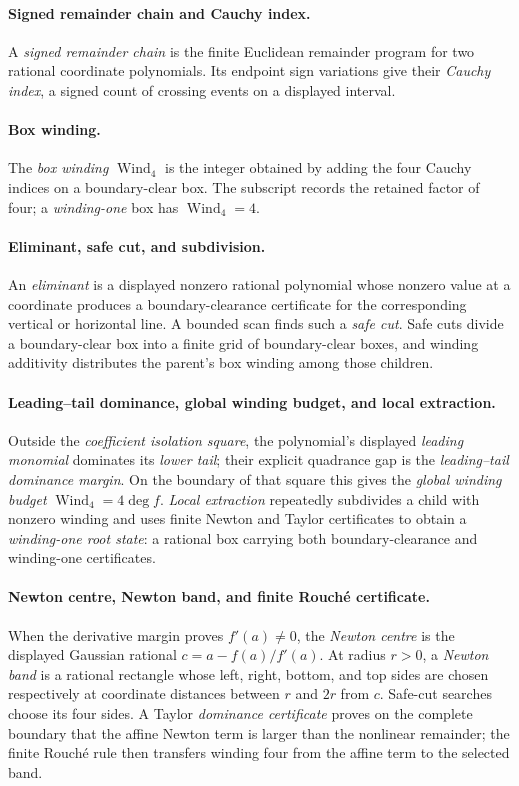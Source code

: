 \documentclass[11pt]{article}
\newcommand{\Wind}{\operatorname{Wind}}
\begin{document}
\paragraph{Signed remainder chain and Cauchy index.}
A \emph{signed remainder chain} is the finite Euclidean remainder program
for two rational coordinate polynomials.  Its endpoint sign variations give
their \emph{Cauchy index}, a signed count of crossing events on a displayed
interval.

\paragraph{Box winding.}
The \emph{box winding} $\Wind_4$ is the integer obtained by adding the four
Cauchy indices on a boundary-clear box.  The subscript records the retained
factor of four; a \emph{winding-one} box has $\Wind_4=4$.

\paragraph{Eliminant, safe cut, and subdivision.}
An \emph{eliminant} is a displayed nonzero rational polynomial whose nonzero
value at a coordinate produces a boundary-clearance certificate for the
corresponding vertical or horizontal line.  A bounded scan finds such a
\emph{safe cut}.  Safe cuts divide a boundary-clear box into a finite grid of
boundary-clear boxes, and winding additivity distributes the parent's box
winding among those children.

\paragraph{Leading--tail dominance, global winding budget, and local
extraction.}
Outside the \emph{coefficient isolation square}, the polynomial's displayed
\emph{leading monomial} dominates its \emph{lower tail}; their explicit
quadrance gap is the \emph{leading--tail dominance margin}.  On the boundary
of that square this gives the \emph{global winding budget}
$\Wind_4=4\deg f$.  \emph{Local extraction} repeatedly subdivides a child
with nonzero winding and uses finite Newton and Taylor certificates to obtain
a \emph{winding-one root state}: a rational box carrying both
boundary-clearance and winding-one certificates.

\paragraph{Newton centre, Newton band, and finite Rouch\'e certificate.}
When the derivative margin proves $f'(a)\ne0$, the \emph{Newton centre} is
the displayed Gaussian rational $c=a-f(a)/f'(a)$.  At radius $r>0$, a
\emph{Newton band} is a rational rectangle whose left, right, bottom, and top
sides are chosen respectively at coordinate distances between $r$ and $2r$
from $c$.  Safe-cut searches choose its four sides.  A Taylor
\emph{dominance certificate} proves on the complete boundary that the affine
Newton term is larger than the nonlinear remainder; the finite Rouch\'e rule
then transfers winding four from the affine term to the selected band.
\end{document}
